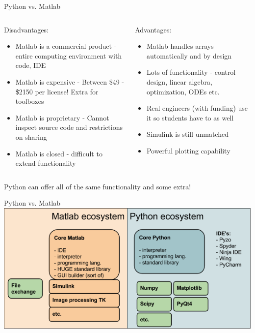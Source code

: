 \documentclass[11pt,professionalfonts]{beamer}
\begin{document}
\begin{frame}{Python vs. Matlab}
\begin{columns}[t]
\begin{column}{0.5\textwidth}
Disadvantages:
    \begin{itemize}
        \item Matlab is a commercial product - entire computing environment with code, IDE
        \item Matlab is expensive - Between \$49 - \$2150 per license! Extra for toolboxes
        \item Matlab is proprietary - Cannot inspect source code and restrictions on sharing 
        \item Matlab is closed - difficult to extend functionality 
    \end{itemize}
\end{column}
\pause
\begin{column}{0.5\textwidth}
    Advantages:
    \begin{itemize}
        \item Matlab handles arrays automatically and by design
        \item Lots of functionality - control design, linear algebra, optimization, ODEs etc.
        \item Real engineers (with funding) use it so students have to as well
        \item Simulink is still unmatched
        \item Powerful plotting capability
    \end{itemize}
\end{column}
\end{columns}
\pause
\begin{alertblock}{}
    \centering
    Python can offer all of the same functionality and some extra!
\end{alertblock}
\end{frame}

\begin{frame}{Python vs. Matlab}
    \includegraphics[width=\textwidth, height=\textheight, keepaspectratio]{figures/pythonvsmatlab.png}
\end{frame}
\end{document}
